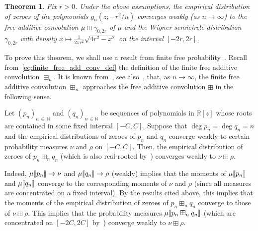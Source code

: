 \documentclass[10pt]{amsart}
\newtheorem{theo}{Theorem}[section]
\theoremstyle{definition}\newtheorem{defi}[theo]{Definition}\newtheorem{rema}[theo]{Remark}\newtheorem{exam}[theo]{Example}\newtheorem{exem}[theo]{Example}\newtheorem{nota}[theo]{Notation}
\newcommand{\llbracket}{\mathopen{[\mkern -2.7mu[}}
\newcommand{\rrbracket}{\mathclose{]\mkern -2.7mu]}}
\newcommand{\lsem}{\llbracket}
\newcommand{\rsem}{\rrbracket}
\newcommand{\N}{\mathbb{N}}
\newcommand{\bR}{\mathbb{R}}
\begin{document}
\begin{theo}\label{theo:heat_flow_zeroes_algebraic}
Fix $r>0$. Under the above assumptions, the empirical distribution of zeroes of the polynomials $g_{n}(z; -r^2/n)$ converges weakly (as $n\to\infty$) to the free additive convolution $\mu \boxplus \gamma_{0, 2r}$ of $\mu$ and the Wigner semicircle distribution $\gamma_{0,2r}$ with density $x\mapsto \frac 1 {2\pi r^2} \sqrt{4r^2-x^2}$ on the interval $[-2 r,2r]$.
\end{theo}

To prove this theorem, we shall use a result from finite free probability~\cite{marcus,marcus_spielman_srivastava}. Recall from~\eqref{eq:finite_free_add_conv_def} the definition of the finite free additive convolution $\boxplus_{n}$. It is known from~\cite[Corollary~5.5 and Theorem~5.4]{arizmendi_perales}, see also~\cite[Theorem~4.3]{marcus}, that, as $n\to\infty$, the finite free additive convolution $\boxplus_n$ approaches the free additive convolution $\boxplus$ in the following sense.

\begin{prop}\label{prop:finite_free_add_conv_to_free_add}
Let $(p_n)_{n\,\in\,\N}$ and $(q_n)_{n\,\in \N}$ be sequences of polynomials in $\bR[z]$ whose roots are contained in some fixed interval $[-C,C]$. Suppose that $\deg p_n = \deg q_n = n$ and the empirical distributions of zeroes of $p_n$ and $q_n$ converge weakly to certain probability measures $\nu$ and $\rho$ on $[-C,C]$. Then, the empirical distribution of zeroes of $p_n\boxplus_n q_n$ (which is also real-rooted by~\cite[Theorem~1.3]{marcus_spielman_srivastava}) converges weakly to $\nu\boxplus \rho$.
\end{prop}

Indeed, $\mu\lsem p_n \rsem\to \nu$ and $\mu\lsem q_n \rsem\to \rho$ (weakly) implies that the moments of $\mu\lsem p_n \rsem$ and $\mu\lsem q_n \rsem$ converge to the corresponding moments of $\nu$ and $\rho$ (since all measures are concentrated on a fixed interval). By the results cited above, this implies that the moments of the empirical distribution of zeroes of $p_n\boxplus_n q_n$ converge to those of $\nu\boxplus \rho$. This implies that the probability measures $\mu\lsem p_n \boxplus_n q_n \rsem$ (which are concentrated on $[-2C,2C]$ by~\cite[Theorem~1.3]{marcus_spielman_srivastava}) converge weakly to $\nu \boxplus \rho$.
\end{document}
